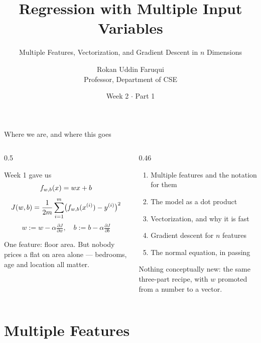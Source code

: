 \documentclass[aspectratio=169,10pt]{beamer}
\title[CSE 815 -- Week 2, Part 1]{Regression with Multiple Input Variables}
\subtitle{Multiple Features, Vectorization, and Gradient Descent in $n$ Dimensions}
\author{Rokan Uddin Faruqui\\ \small Professor, Department of CSE}
\institute{\small University of Chittagong \\ \texttt{rufaruqui@cu.ac.bd}}
\date[Week 2 / Part 1]{Week 2 $\cdot$ Part 1}
\begin{document}
\begin{frame}
  \titlepage
\end{frame}

\begin{frame}{Where we are, and where this goes}
  \begin{columns}[T,onlytextwidth]
    \begin{column}{0.5\textwidth}
      \begin{block}{Week 1 gave us}
        \[ f_{w,b}(x)=wx+b \]
        \[ J(w,b)=\frac{1}{2m}\sum_{i=1}^{m}\bigl(f_{w,b}(x^{(i)})-y^{(i)}\bigr)^2 \]
        \[ w := w-\alpha\tfrac{\partial J}{\partial w},\quad b := b-\alpha\tfrac{\partial J}{\partial b} \]
      \end{block}
      \small One feature: floor area. But nobody prices a flat on area alone ---
      bedrooms, age and location all matter.
    \end{column}
    \begin{column}{0.46\textwidth}
      \begin{keyidea}[Today]
        \small
        \begin{enumerate}
          \item Multiple features and the notation for them 
          \item The model as a dot product  
          \item Vectorization, and why it is fast 
          \item Gradient descent for $n$ features %
          \item The normal equation, in passing %
        \end{enumerate}
      \end{keyidea}
      \small Nothing conceptually new: the same three-part recipe, with $w$
      promoted from a number to a vector.
    \end{column}
  \end{columns}
\end{frame}

\section{Multiple Features}
\end{document}
